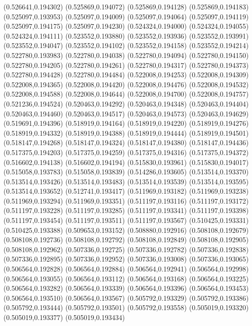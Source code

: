 (0.526641,0.194302)
(0.525869,0.194072)
(0.525869,0.194128)
(0.525869,0.194183)
(0.525097,0.193953)
(0.525097,0.194009)
(0.525097,0.194064)
(0.525097,0.194119)
(0.525097,0.194175)
(0.525097,0.194230)
(0.524324,0.194000)
(0.524324,0.194055)
(0.524324,0.194111)
(0.523552,0.193880)
(0.523552,0.193936)
(0.523552,0.193991)
(0.523552,0.194047)
(0.523552,0.194102)
(0.523552,0.194158)
(0.523552,0.194214)
(0.522780,0.193983)
(0.522780,0.194038)
(0.522780,0.194094)
(0.522780,0.194150)
(0.522780,0.194205)
(0.522780,0.194261)
(0.522780,0.194317)
(0.522780,0.194373)
(0.522780,0.194428)
(0.522780,0.194484)
(0.522008,0.194253)
(0.522008,0.194309)
(0.522008,0.194365)
(0.522008,0.194420)
(0.522008,0.194476)
(0.522008,0.194532)
(0.522008,0.194588)
(0.522008,0.194644)
(0.522008,0.194700)
(0.522008,0.194757)
(0.521236,0.194524)
(0.520463,0.194292)
(0.520463,0.194348)
(0.520463,0.194404)
(0.520463,0.194460)
(0.520463,0.194517)
(0.520463,0.194573)
(0.520463,0.194629)
(0.519691,0.194396)
(0.518919,0.194164)
(0.518919,0.194220)
(0.518919,0.194276)
(0.518919,0.194332)
(0.518919,0.194388)
(0.518919,0.194444)
(0.518919,0.194501)
(0.518147,0.194268)
(0.518147,0.194324)
(0.518147,0.194380)
(0.518147,0.194436)
(0.517375,0.194203)
(0.517375,0.194259)
(0.517375,0.194316)
(0.517375,0.194372)
(0.516602,0.194138)
(0.516602,0.194194)
(0.515830,0.193961)
(0.515830,0.194017)
(0.515058,0.193783)
(0.515058,0.193839)
(0.514286,0.193605)
(0.513514,0.193370)
(0.513514,0.193426)
(0.513514,0.193483)
(0.513514,0.193539)
(0.513514,0.193595)
(0.513514,0.193652)
(0.512741,0.193417)
(0.511969,0.193182)
(0.511969,0.193238)
(0.511969,0.193294)
(0.511969,0.193351)
(0.511197,0.193116)
(0.511197,0.193172)
(0.511197,0.193228)
(0.511197,0.193285)
(0.511197,0.193341)
(0.511197,0.193398)
(0.511197,0.193454)
(0.511197,0.193511)
(0.511197,0.193567)
(0.510425,0.193331)
(0.510425,0.193388)
(0.509653,0.193152)
(0.508880,0.192916)
(0.508108,0.192679)
(0.508108,0.192736)
(0.508108,0.192792)
(0.508108,0.192849)
(0.508108,0.192905)
(0.508108,0.192962)
(0.507336,0.192725)
(0.507336,0.192782)
(0.507336,0.192838)
(0.507336,0.192895)
(0.507336,0.192952)
(0.507336,0.193008)
(0.507336,0.193065)
(0.506564,0.192828)
(0.506564,0.192884)
(0.506564,0.192941)
(0.506564,0.192998)
(0.506564,0.193055)
(0.506564,0.193112)
(0.506564,0.193168)
(0.506564,0.193225)
(0.506564,0.193282)
(0.506564,0.193339)
(0.506564,0.193396)
(0.506564,0.193453)
(0.506564,0.193510)
(0.506564,0.193567)
(0.505792,0.193329)
(0.505792,0.193386)
(0.505792,0.193444)
(0.505792,0.193501)
(0.505792,0.193558)
(0.505019,0.193320)
(0.505019,0.193377)
(0.505019,0.193434)
